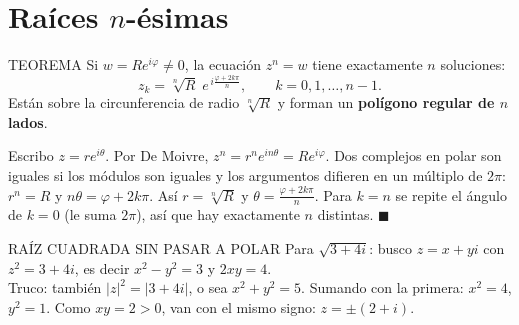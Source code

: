 \section{Raíces $n$-ésimas}
\begin{sello}{TEOREMA}
Si $w=Re^{i\varphi}\neq0$, la ecuación $z^n=w$ tiene exactamente $n$ soluciones:
\[z_k=\sqrt[n]{R}\;e^{\,i\frac{\varphi+2k\pi}{n}},\qquad k=0,1,\dots,n-1.\]
Están sobre la circunferencia de radio $\sqrt[n]R$ y forman un \textbf{polígono regular de $n$ lados}.
\end{sello}
\begin{demo}
Escribo $z=re^{i\theta}$. Por De Moivre, $z^n=r^ne^{in\theta}=Re^{i\varphi}$. Dos complejos en polar son iguales si los módulos son iguales y los argumentos difieren en un múltiplo de $2\pi$: $r^n=R$ y $n\theta=\varphi+2k\pi$. Así $r=\sqrt[n]R$ y $\theta=\frac{\varphi+2k\pi}n$. Para $k=n$ se repite el ángulo de $k=0$ (le suma $2\pi$), así que hay exactamente $n$ distintas. $\blacksquare$
\end{demo}
\begin{center}
\end{center}
\begin{metodo}{RAÍZ CUADRADA SIN PASAR A POLAR}
Para $\sqrt{3+4i}$: busco $z=x+yi$ con $z^2=3+4i$, es decir $x^2-y^2=3$ y $2xy=4$.\\
Truco: también $|z|^2=|3+4i|$, o sea $x^2+y^2=5$. Sumando con la primera: $x^2=4$, $y^2=1$. Como $xy=2>0$, van con el mismo signo: $z=\pm(2+i)$.
\end{metodo}

